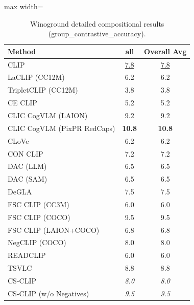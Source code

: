 \begin{table}[t]
  \centering
  \scriptsize
  \caption{Winoground detailed compositional results (group_contrastive_accuracy).}
  \label{tab:Winoground_detailed}
  \begin{adjustbox}{max width=\textwidth}
  \setlength{\tabcolsep}{2pt}
  \begin{tabular}{p{5cm}c|c}
    \toprule
    Method & all & Overall Avg \\
    \midrule
    CLIP & \underline{7.8} & \underline{7.8} \\
    \midrule
    LaCLIP (CC12M) & 6.2 & 6.2 \\
    TripletCLIP (CC12M) & 3.8 & 3.8 \\
    \midrule
    CE CLIP & 5.2 & 5.2 \\
    CLIC CogVLM (LAION) & 9.2 & 9.2 \\
    CLIC CogVLM (PixPR RedCaps) & \textbf{10.8} & \textbf{10.8} \\
    CLoVe & 6.2 & 6.2 \\
    CON CLIP & 7.2 & 7.2 \\
    DAC (LLM) & 6.5 & 6.5 \\
    DAC (SAM) & 6.5 & 6.5 \\
    DeGLA & 7.5 & 7.5 \\
    FSC CLIP (CC3M) & 6.0 & 6.0 \\
    FSC CLIP (COCO) & 9.5 & 9.5 \\
    FSC CLIP (LAION+COCO) & 6.8 & 6.8 \\
    NegCLIP (COCO) & 8.0 & 8.0 \\
    READCLIP & 6.0 & 6.0 \\
    TSVLC & 8.8 & 8.8 \\
    \midrule
    CS-CLIP & \emph{8.0} & \emph{8.0} \\
    CS-CLIP (w/o Negatives) & \emph{9.5} & \emph{9.5} \\
    \bottomrule
  \end{tabular}
  \end{adjustbox}
\end{table}

